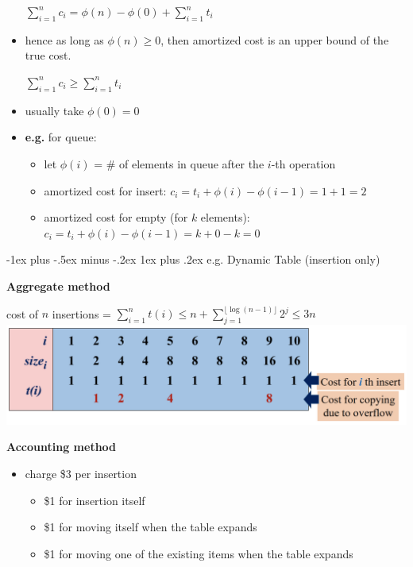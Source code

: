 \documentclass[10pt, landscape]{article}
\makeatletter
\renewcommand{\subsubsection}{\@startsection{subsubsection}{3}{0mm}%
  {-1ex plus -.5ex minus -.2ex}%
  {1ex plus .2ex}%
{\normalfont\small\bfseries}}%
\makeatother
\begin{document}
\begin{multicols*}{4}
\begin{itemize}
\begin{tightcenter}
        $\sum^n_{i=1} c_i = \phi(n) - \phi(0) + \sum^n_{i=1} t_i$
      \end{tightcenter}
    \item hence as long as $\phi(n) \geq 0$, then amortized cost is an upper bound of the true cost. 
      \begin{tightcenter}
        $\sum^n_{i=1} c_i \geq \sum^n_{i=1} t_i$
      \end{tightcenter}
    \item usually take $\phi(0) = 0$
    \item \textbf{e.g.} for queue:
      \begin{itemize}
        \item let $\phi(i)$ = \# of elements in queue after the $i$-th operation
        \item amortized cost for insert: $c_i = t_i + \phi(i) - \phi(i-1) = 1 + 1 = 2$
        \item amortized cost for empty (for $k$ elements): $c_i = t_i + \phi(i) - \phi(i-1) = k + 0 - k = 0 $
      \end{itemize}
  \end{itemize}

  \subsubsection{e.g. Dynamic Table (insertion only)}

  \textbf{Aggregate method}

  \begin{tightcenter}
    cost of $n$ insertions = $\sum^n_{i=1} t(i) \leq n + \sum^{ \lfloor \log(n-1) \rfloor  }_{j=1} 2^j \leq 3n$
    \includegraphics[width=0.95\linewidth]{st2131-dynamic-table-aggregate-method.png} 
  \end{tightcenter}

  \textbf{Accounting method}

  \begin{itemize}
    \item charge \$3 per insertion
      \begin{itemize}
        \item \$1 for insertion itself
        \item \$1 for moving itself when the table expands
        \item \$1 for moving one of the existing items when the table expands
      \end{itemize}
  \end{itemize}


\end{multicols*}
\end{document}

